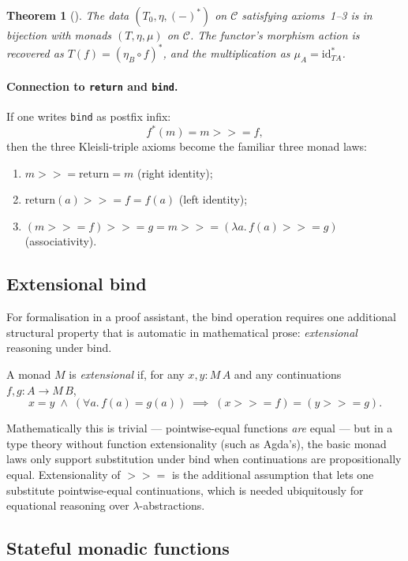 \documentclass[11pt]{article}
\newtheorem{theorem}{Theorem}
\newcommand{\id}{\mathrm{id}}
\newcommand{\bind}{\mathbin{>\!\!\!>\!\!=}}
\newcommand{\ret}{\mathrm{return}}
\begin{document}
\begin{theorem}[\cite{Manes}]
The data $(T_0, \eta, (-)^*)$ on $\mathcal{C}$ satisfying axioms~1--3
is in bijection with monads $(T, \eta, \mu)$ on $\mathcal{C}$.  The
functor's morphism action is recovered as $T(f) = (\eta_B \circ f)^*$,
and the multiplication as $\mu_A = \id_{T A}^*$.
\end{theorem}

\paragraph{Connection to \texttt{return} and \texttt{bind}.}
If one writes \texttt{bind} as postfix infix:
\[
  f^*(m) = m \bind f,
\]
then the three Kleisli-triple axioms become the familiar three monad
laws:
\begin{enumerate}
  \item $m \bind \ret = m$ (right identity);
  \item $\ret(a) \bind f = f(a)$ (left identity);
  \item $(m \bind f) \bind g = m \bind (\lambda a.\, f(a) \bind g)$
        (associativity).
\end{enumerate}

\subsection{Extensional bind}
\label{sec:extbind}

For formalisation in a proof assistant, the bind operation requires
one additional structural property that is automatic in mathematical
prose: \emph{extensional} reasoning under bind.

A monad $M$ is \emph{extensional} if, for any $x, y : M\,A$ and any
continuations $f, g : A \to M\,B$,
\[
  x = y \;\wedge\; (\forall a.\, f(a) = g(a)) \;\implies\; (x \bind f) = (y \bind g).
\]

Mathematically this is trivial --- pointwise-equal functions
\emph{are} equal --- but in a type theory without function
extensionality (such as Agda's), the basic monad laws only support
substitution under bind when continuations are propositionally equal.
Extensionality of $\bind$ is the additional assumption that lets one
substitute pointwise-equal continuations, which is needed
ubiquitously for equational reasoning over $\lambda$-abstractions.

\subsection{Stateful monadic functions}
\label{sec:sfunm}
\end{document}
